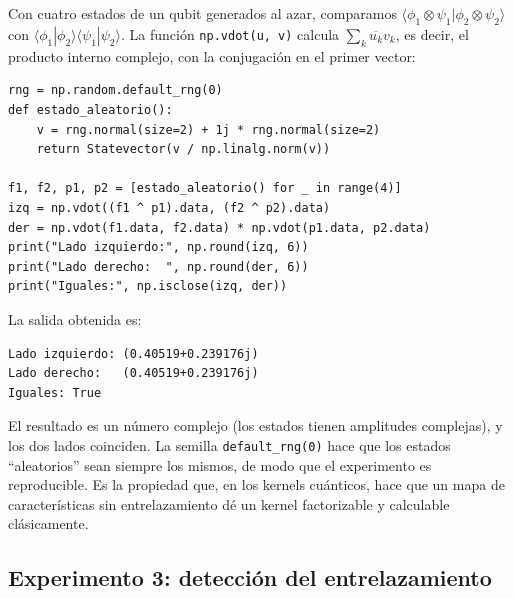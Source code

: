 \documentclass[11pt, a4paper, twoside, openright]{report}
\begin{document}
\noindent Con cuatro estados de un qubit generados al azar, comparamos $\langle\phi_1\otimes\psi_1|\phi_2\otimes\psi_2\rangle$ con $\langle\phi_1|\phi_2\rangle\langle\psi_1|\psi_2\rangle$. La función \texttt{np.vdot(u, v)} calcula $\sum_k\overline{u_k}v_k$, es decir, el producto interno complejo, con la conjugación en el primer vector:
\begin{lstlisting}
rng = np.random.default_rng(0)
def estado_aleatorio():
    v = rng.normal(size=2) + 1j * rng.normal(size=2)
    return Statevector(v / np.linalg.norm(v))

f1, f2, p1, p2 = [estado_aleatorio() for _ in range(4)]
izq = np.vdot((f1 ^ p1).data, (f2 ^ p2).data)
der = np.vdot(f1.data, f2.data) * np.vdot(p1.data, p2.data)
print("Lado izquierdo:", np.round(izq, 6))
print("Lado derecho:  ", np.round(der, 6))
print("Iguales:", np.isclose(izq, der))
\end{lstlisting}
\noindent La salida obtenida es:
\begin{lstlisting}[language={}]
Lado izquierdo: (0.40519+0.239176j)
Lado derecho:   (0.40519+0.239176j)
Iguales: True
\end{lstlisting}
\noindent El resultado es un número complejo (los estados tienen amplitudes complejas), y los dos lados coinciden. La semilla \texttt{default\_rng(0)} hace que los estados ``aleatorios'' sean siempre los mismos, de modo que el experimento es reproducible. Es la propiedad que, en los kernels cuánticos, hace que un mapa de características sin entrelazamiento dé un kernel factorizable y calculable clásicamente.

\subsection{Experimento 3: detección del entrelazamiento}
\end{document}
